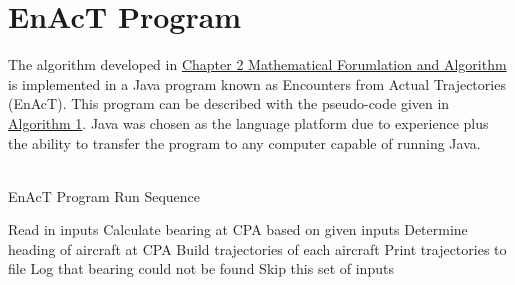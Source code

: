 \chapter{EnAcT Program}
\label{chap:enactprogram}

The algorithm developed in \hyperref[chap:math]{Chapter 2 Mathematical Forumlation and Algorithm} is implemented in a Java program known as Encounters from Actual Trajectories (EnAcT). This program can be described with the pseudo-code given in \hyperref[alg:enactrun]{Algorithm 1}. Java was chosen as the language platform due to experience plus the ability to transfer the program to any computer capable of running Java.
~\\
~\\
\begin{algorithm}[H]
\caption{EnAcT Program Run Sequence}
\label{alg:enactrun}
\begin{algorithmic}

\State Read in inputs
    \State Calculate bearing at CPA based on given inputs
        \State Determine heading of aircraft at CPA
        \State Build trajectories of each aircraft
        \State Print trajectories to file
    \Else
        \State Log that bearing could not be found
        \State Skip this set of inputs
    \EndIf
\EndWhile 
\end{algorithmic}
\end{algorithm}
~\\

